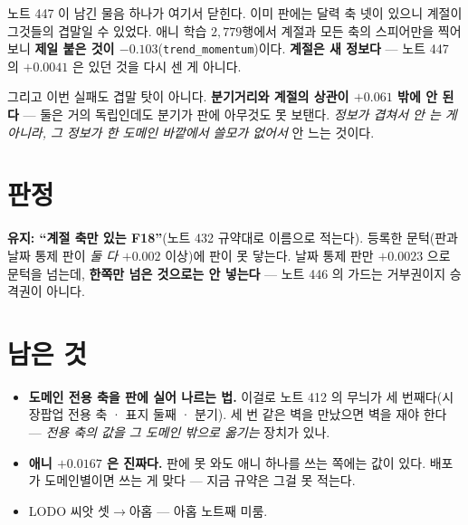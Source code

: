 \documentclass[11pt]{article}
\begin{document}
노트 447 이 남긴 물음 하나가 여기서 닫힌다. 이미 판에는 달력 축 넷이
있으니 계절이 그것들의 겹말일 수 있었다. 애니 학습 $2{,}779$행에서
계절과 모든 축의 스피어만을 찍어 보니 \textbf{제일 붙은 것이
$-0.103$}(\texttt{trend\_momentum})이다. \textbf{계절은 새 정보다} ---
노트 447 의 $+0.0041$ 은 있던 것을 다시 센 게 아니다.

그리고 이번 실패도 겹말 탓이 아니다. \textbf{분기거리와 계절의 상관이
$+0.061$ 밖에 안 된다} --- 둘은 거의 독립인데도 분기가 판에 아무것도
못 보탠다. \emph{정보가 겹쳐서 안 는 게 아니라, 그 정보가 한 도메인
바깥에서 쓸모가 없어서} 안 느는 것이다.

\section{판정}

\textbf{유지: ``계절 축만 있는 F18''}(노트 432 규약대로 이름으로 적는다).
등록한 문턱(판과 날짜 통제 판이 \emph{둘 다} $+0.002$ 이상)에 판이 못
닿는다. 날짜 통제 판만 $+0.0023$ 으로 문턱을 넘는데, \textbf{한쪽만
넘은 것으로는 안 넣는다} --- 노트 446 의 가드는 거부권이지 승격권이 아니다.

\section*{남은 것}

\begin{itemize}
\item \textbf{도메인 전용 축을 판에 실어 나르는 법.} 이걸로 노트 412 의
무늬가 세 번째다(시장팝업 전용 축 · 표지 둘째 · 분기). 세 번 같은 벽을
만났으면 벽을 재야 한다 --- \emph{전용 축의 값을 그 도메인 밖으로
옮기는} 장치가 있나.
\item \textbf{애니 $+0.0167$ 은 진짜다.} 판에 못 와도 애니 하나를 쓰는
쪽에는 값이 있다. 배포가 도메인별이면 쓰는 게 맞다 --- 지금 규약은
그걸 못 적는다.
\item LODO 씨앗 셋$\to$아홉 --- 아홉 노트째 미룸.
\end{itemize}
\end{document}
